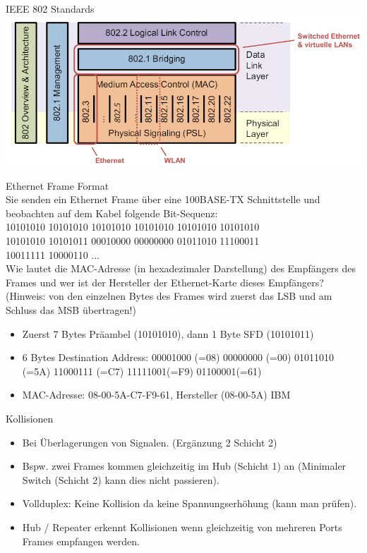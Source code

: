 \begin{definition}{IEEE 802 Standards}\\
        \includegraphics[width=0.8\linewidth]{images/ieee_standards.png}
\end{definition}

\begin{example2}{Ethernet Frame Format}\\
    Sie senden ein Ethernet Frame über eine 100BASE-TX Schnittstelle und beobachten auf dem Kabel folgende Bit-Sequenz:\\
    10101010 10101010 10101010 10101010 10101010 10101010\\
    10101010 10101011 00010000 00000000 01011010 11100011\\
    10011111 10000110 ...\\
    Wie lautet die MAC-Adresse (in hexadezimaler Darstellung) des Empfängers des Frames und
    wer ist der Hersteller der Ethernet-Karte dieses Empfängers?
    (Hinweis: von den einzelnen Bytes des Frames wird zuerst das LSB und am Schluss das
    MSB übertragen!)
    \begin{itemize}
        \item Zuerst 7 Bytes Präambel (10101010), dann 1 Byte SFD (10101011)
        \item 6 Bytes Destination Address: 00001000 (=08) 00000000 (=00) 01011010 (=5A) 11000111 (=C7) 11111001(=F9) 01100001(=61)
        \item MAC-Adresse: 08-00-5A-C7-F9-61, Hersteller (08-00-5A) IBM
    \end{itemize}
\end{example2}

\begin{definition}{Kollisionen}
    \begin{itemize}
        \item Bei Überlagerungen von Signalen. (Ergänzung 2 Schicht 2)
        \item Bspw. zwei Frames kommen gleichzeitig im Hub (Schicht 1) an (Minimaler Switch (Schicht 2) kann dies nicht passieren).
        \item Vollduplex: Keine Kollision da keine Spannungserhöhung (kann man prüfen).
        \item Hub / Repeater erkennt Kollisionen wenn gleichzeitig von mehreren Ports Frames empfangen werden.
    \end{itemize}
\end{definition}

